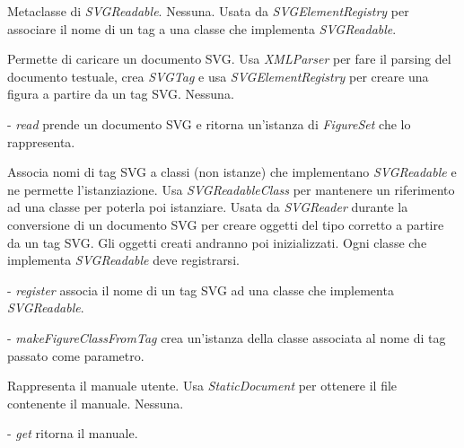 Metaclasse di \textit{SVGReadable}.
Nessuna.
Usata da \textit{SVGElementRegistry} per associare il nome di un tag a una classe che implementa \textit{SVGReadable}.

Permette di caricare un documento SVG.
Usa \textit{XMLParser} per fare il parsing del documento testuale, crea \textit{SVGTag} e usa \textit{SVGElementRegistry} per creare una figura a partire da un tag SVG.
Nessuna.
\begin{elencopuntato}[\normindent]
\item[-] \textit{read} prende un documento SVG e ritorna un'istanza di \textit{FigureSet} che lo rappresenta.
\end{elencopuntato}

Associa nomi di tag SVG a classi (non istanze) che implementano \textit{SVGReadable} e ne permette l'istanziazione. 
Usa \textit{SVGReadableClass} per mantenere un riferimento ad una classe per poterla poi istanziare.
Usata da \textit{SVGReader} durante la conversione di un documento SVG per creare oggetti del tipo corretto a partire da un tag SVG. Gli oggetti creati andranno poi inizializzati. Ogni classe che implementa \textit{SVGReadable} deve registrarsi.
\begin{elencopuntato}[\normindent]
\item[-] \textit{register} associa il nome di un tag SVG ad una classe che implementa \textit{SVGReadable}.
\item[-] \textit{makeFigureClassFromTag} crea un'istanza della classe associata al nome di tag passato come parametro.
\end{elencopuntato}

Rappresenta il manuale utente.
Usa \textit{StaticDocument} per ottenere il file contenente il manuale.
Nessuna.
\begin{elencopuntato}[\normindent]
\item[-] \textit{get} ritorna il manuale.
\end{elencopuntato}

